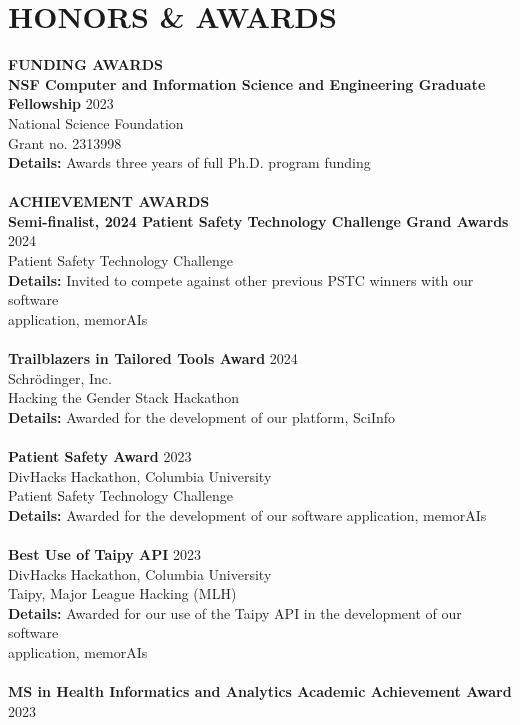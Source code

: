 \documentclass[a4paper,12pt]{article}
\begin{document}
{\section*{HONORS \& AWARDS}
\textbf{FUNDING AWARDS} \\[0.5em]
\textbf{NSF Computer and Information Science and Engineering Graduate Fellowship} \hfill 2023\\
National Science Foundation\\
Grant no. 2313998 \\
\textbf{Details:} Awards three years of full Ph.D. program funding \\
\\
\textbf{ACHIEVEMENT AWARDS} \\[0.5em]
\textbf{Semi-finalist, 2024 Patient Safety Technology Challenge Grand Awards} \hfill 2024\\
Patient Safety Technology Challenge\\
\textbf{Details:} Invited to compete against other previous PSTC winners with our software \\application, memorAIs \\
\\
\textbf{Trailblazers in Tailored Tools Award} \hfill 2024\\
Schrödinger, Inc.\\
Hacking the Gender Stack Hackathon\\
\textbf{Details:} Awarded for the development of our platform, SciInfo \\
\\
\textbf{Patient Safety Award} \hfill 2023\\
DivHacks Hackathon, Columbia University\\
Patient Safety Technology Challenge\\
\textbf{Details:} Awarded for the development of our software application, memorAIs \\
\\
\textbf{Best Use of Taipy API} \hfill 2023\\
DivHacks Hackathon, Columbia University\\
Taipy, Major League Hacking (MLH)\\
\textbf{Details:} Awarded for our use of the Taipy API in the development of our software \\application, memorAIs \\
\\
\textbf{MS in Health Informatics and Analytics Academic Achievement Award} \hfill 2023\\
}
\end{document}
